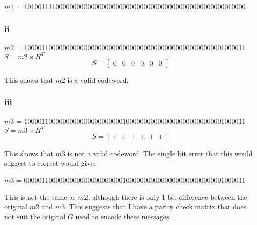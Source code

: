 \noindent $m1$ = 101001111000000000000000000000000000000000000000000000000010000

\subsubsection{ii}
$m2$ = 100001100000000000000000000000000000000000000000000000001000011	\\

$S = m2 \times H^{T}$ \\
\[ S = \left[ \begin{array}{cccccc} 0 & 0 & 0 & 0 & 0 & 0 \end{array} \right] \]

This shows that $m2$ is a valid codeword.

\subsubsection{iii}
$m3$ = 100001100000000000000000000010000000000000000000000000001000011	\\

$S = m3 \times H^{T}$ \\
\[ S = \left[ \begin{array}{cccccc} 1 & 1 & 1 & 1 & 1 & 1 \end{array} \right] \]

This shows that $m3$ is not a valid codeword.
The single bit error that this would suggest to correct would give:

$m3$ = 000001100000000000000000000010000000000000000000000000001000011

This is not the same as $m2$, although there is only 1 bit difference between the original $m2$ and $m3$.
This suggests that I have a parity check matrix that does not suit the original $G$ used to encode these messages.
